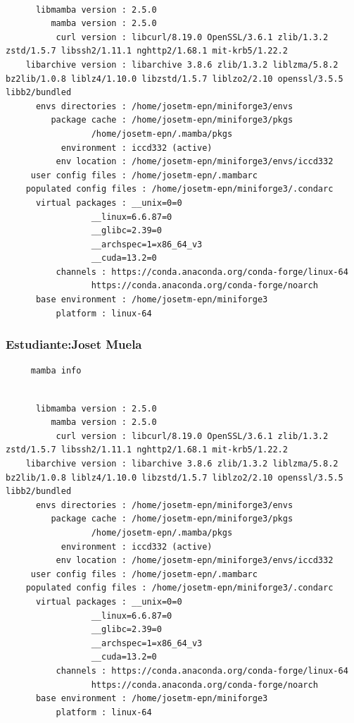 \documentclass{article}
\begin{document}
\begin{verbatim}

	  libmamba version : 2.5.0
	     mamba version : 2.5.0
	      curl version : libcurl/8.19.0 OpenSSL/3.6.1 zlib/1.3.2 zstd/1.5.7 libssh2/1.11.1 nghttp2/1.68.1 mit-krb5/1.22.2
	libarchive version : libarchive 3.8.6 zlib/1.3.2 liblzma/5.8.2 bz2lib/1.0.8 liblz4/1.10.0 libzstd/1.5.7 liblzo2/2.10 openssl/3.5.5 libb2/bundled
	  envs directories : /home/josetm-epn/miniforge3/envs
	     package cache : /home/josetm-epn/miniforge3/pkgs
			     /home/josetm-epn/.mamba/pkgs
	       environment : iccd332 (active)
	      env location : /home/josetm-epn/miniforge3/envs/iccd332
	 user config files : /home/josetm-epn/.mambarc
    populated config files : /home/josetm-epn/miniforge3/.condarc
	  virtual packages : __unix=0=0
			     __linux=6.6.87=0
			     __glibc=2.39=0
			     __archspec=1=x86_64_v3
			     __cuda=13.2=0
		  channels : https://conda.anaconda.org/conda-forge/linux-64
			     https://conda.anaconda.org/conda-forge/noarch
	  base environment : /home/josetm-epn/miniforge3
		  platform : linux-64
\end{verbatim}


\subsubsection{Estudiante:Joset Muela}
\label{sec:org1481976}
\begin{verbatim}
     mamba info
\end{verbatim}

\begin{verbatim}

	  libmamba version : 2.5.0
	     mamba version : 2.5.0
	      curl version : libcurl/8.19.0 OpenSSL/3.6.1 zlib/1.3.2 zstd/1.5.7 libssh2/1.11.1 nghttp2/1.68.1 mit-krb5/1.22.2
	libarchive version : libarchive 3.8.6 zlib/1.3.2 liblzma/5.8.2 bz2lib/1.0.8 liblz4/1.10.0 libzstd/1.5.7 liblzo2/2.10 openssl/3.5.5 libb2/bundled
	  envs directories : /home/josetm-epn/miniforge3/envs
	     package cache : /home/josetm-epn/miniforge3/pkgs
			     /home/josetm-epn/.mamba/pkgs
	       environment : iccd332 (active)
	      env location : /home/josetm-epn/miniforge3/envs/iccd332
	 user config files : /home/josetm-epn/.mambarc
    populated config files : /home/josetm-epn/miniforge3/.condarc
	  virtual packages : __unix=0=0
			     __linux=6.6.87=0
			     __glibc=2.39=0
			     __archspec=1=x86_64_v3
			     __cuda=13.2=0
		  channels : https://conda.anaconda.org/conda-forge/linux-64
			     https://conda.anaconda.org/conda-forge/noarch
	  base environment : /home/josetm-epn/miniforge3
		  platform : linux-64
\end{verbatim}
\end{document}
